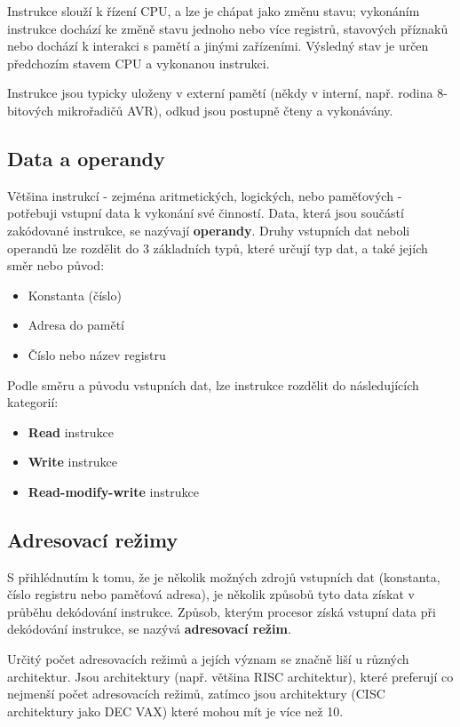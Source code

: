 Instrukce slouží k řízení CPU, a lze je chápat jako změnu stavu; vykonáním instrukce dochází ke
změně stavu jednoho nebo více registrů, stavových příznaků nebo dochází k interakci s pamětí a
jinými zařízeními. Výsledný stav je určen předchozím stavem CPU a vykonanou instrukci.

Instrukce jsou typicky uloženy v externí pamětí (někdy v interní, např. rodina 8-bitových
mikrořadičů AVR), odkud jsou postupně čteny a vykonávány.

\subsection{Data a operandy}

Většina instrukcí - zejména aritmetických, logických, nebo paměťových - potřebuji vstupní data k
vykonání své činností. Data, která jsou součástí zakódované instrukce, se nazývají \textbf{operandy}.
Druhy vstupních dat neboli operandů lze rozdělit do 3 základních typů, které určují typ dat, a
také jejích směr nebo původ:

\begin{itemize}
    \item Konstanta (číslo)
    \item Adresa do pamětí
    \item Číslo nebo název registru
\end{itemize}

Podle směru a původu vstupních dat, lze instrukce rozdělit do následujících kategorií:

\begin{itemize}
    \item \textbf{Read} instrukce
    \item \textbf{Write} instrukce
    \item \textbf{Read-modify-write} instrukce
\end{itemize}

\subsection{Adresovací režimy}

S přihlédnutím k tomu, že je několik možných zdrojů vstupních dat (konstanta, číslo registru nebo
paměťová adresa), je několik způsobů tyto data získat v průběhu dekódování instrukce. Způsob,
kterým procesor získá vstupní data při dekódování instrukce, se nazývá \textbf{adresovací režim}.

Určitý počet adresovacích režimů a jejích význam se značně liší u různých architektur. Jsou
architektury (např. většina RISC architektur), které preferují co nejmenší počet adresovacích
režimů, zatímco jsou architektury (CISC architektury jako DEC VAX) které mohou mít je více než
10.


